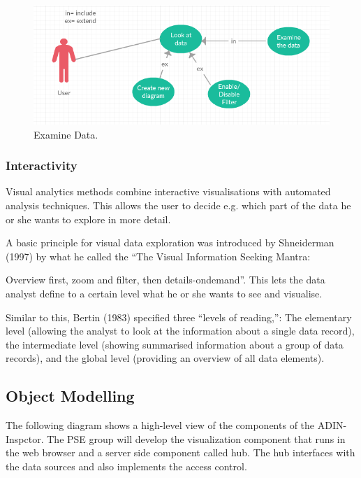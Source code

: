 \documentclass[twoside, english, draft]{Pflichtenheft}
\begin{document}
\begin{description}
\begin{description}
\begin{itemize}
\end{itemize}
\end{description}

 \begin{figure}[h]
	\centering
	\includegraphics[width=\textwidth]{Images/image.PNG}
	\caption{Examine Data.}
\end{figure}
\end{description}


\subsubsection{Interactivity}

Visual analytics methods combine interactive visualisations with automated analysis
techniques. This allows the user to decide e.g. which part
of the data he or she wants to explore in more detail.

A basic principle for visual data exploration was introduced by Shneiderman (1997) by what he called the “The Visual Information Seeking Mantra:

Overview first, zoom and filter, then details-ondemand”.
This lets the data analyst define to a certain level what he or she wants
to see and visualise.

Similar to this, Bertin (1983) specified three “levels of reading,”:
The elementary level (allowing the analyst to look at the information about a
single data record), the intermediate level (showing summarised information about a group of data records), and the global level (providing an overview of all data elements).

\subsection{Object Modelling}

The following diagram shows a high-level view of the components of the ADIN-Inspctor. The PSE group will develop the visualization component that runs in the web browser and a server side component called hub. The hub interfaces with the data sources and also implements the access control.
\end{document}
